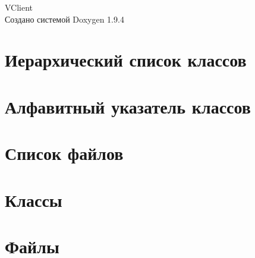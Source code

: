 \documentclass[twoside]{book}
\newcommand{\+}{\discretionary{\mbox{\scriptsize$\hookleftarrow$}}{}{}}
\newcommand{\clearemptydoublepage}{%
    \newpage{\pagestyle{empty}\cleardoublepage}%
  }
\begin{document}
  \raggedbottom
    \hypersetup{pageanchor=false,
                bookmarksnumbered=true,
                pdfencoding=unicode
               }
  \begin{titlepage}
  \vspace*{7cm}
  \begin{center}%
  {\Large VClient}\\
  \vspace*{1cm}
  {\large Создано системой Doxygen 1.9.4}\\
  \end{center}
  \end{titlepage}
  \clearemptydoublepage
  \tableofcontents
  \clearemptydoublepage
  \hypersetup{pageanchor=true}
\chapter{Иерархический список классов}

\chapter{Алфавитный указатель классов}

\chapter{Список файлов}

\chapter{Классы}









\chapter{Файлы}








  \backmatter
  \newpage
  \clearemptydoublepage
  \printindex
\end{document}
